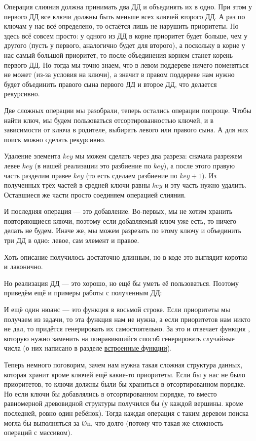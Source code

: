 Операция слияния должна принимать два ДД и объединять их в одно. При этом у первого ДД все ключи должны быть меньше всех ключей второго ДД. А раз по ключам у нас всё определено, то остаётся лишь не нарушить приоритеты. Но здесь всё совсем просто: у одного из ДД в корне приоритет будет больше, чем у другого (пусть у первого, аналогично будет для второго), а поскольку в корне у нас самый большой приоритет, то после объединения корнем станет корень первого ДД. Но тогда мы точно знаем, что в левом поддереве ничего поменяться не может (из-за условия на ключи), а значит в правом поддереве нам нужно будет объединить правого сына первого ДД и второе ДД, что делается рекурсивно.

Две сложных операции мы разобрали, теперь остались операции попроще. Чтобы найти ключ, мы будем пользоваться отсортированностью ключей, и в зависимости от ключа в родителе, выбирать левого или правого сына. А для них поиск можно сделать рекурсивно.

Удаление элемента $key$ мы можем сделать через два разреза: сначала разрежем левее $key$ (в нашей реализации это разбиение по $key$), а после этого правую часть разделим правее $key$ (то есть сделаем разбиение по $key + 1$). Из полученных трёх частей в средней ключи равны $key$ и эту часть нужно удалить. Оставшиеся же части просто соединяем операцией слияния.

И последняя операция — это добавление. Во-первых, мы не хотим хранить повторяющиеся ключи, поэтому если добавляемый ключ уже есть, то ничего делать не будем. Иначе же, мы можем разрезать по этому ключу и объединить три ДД в одно: левое, сам элемент и правое.

Хоть описание получилось достаточно длинным, но в коде это выглядит коротко и лаконично.

\nocode

Но реализация ДД — это хорошо, но ещё бы уметь её пользоваться. Поэтому приведём ещё и примеры работы с полученным ДД:

\nocode

И ещё один нюанс — это функция  в восьмой строке. Если приоритеты мы получаем из задачи, то эта функция нам не нужна, а если приоритетов нам никто не дал, то придётся генерировать их самостоятельно. За это и отвечает функция , которую нужно заменить на понравившийся способ генерировать случайные числа (о них написано в разделе \hyperlink{built-in function}{встроенные функции}).

Теперь немного поговорим, зачем нам нужна такая сложная структура данных, которая хранит кроме ключей ещё какие-то приоритеты. Если бы у нас не было приоритетов, то ключи должны были бы храниться в отсортированном порядке. Но если ключи бы добавлялись в отсортированном порядке, то вместо равномерной древовидной структуры получился бы  (у каждой вершины. кроме последней, ровно один ребёнок). Тогда каждая операция с таким деревом поиска могла бы выполняться за \O{n}, что долго (потому что такая же сложность операций с массивом).

